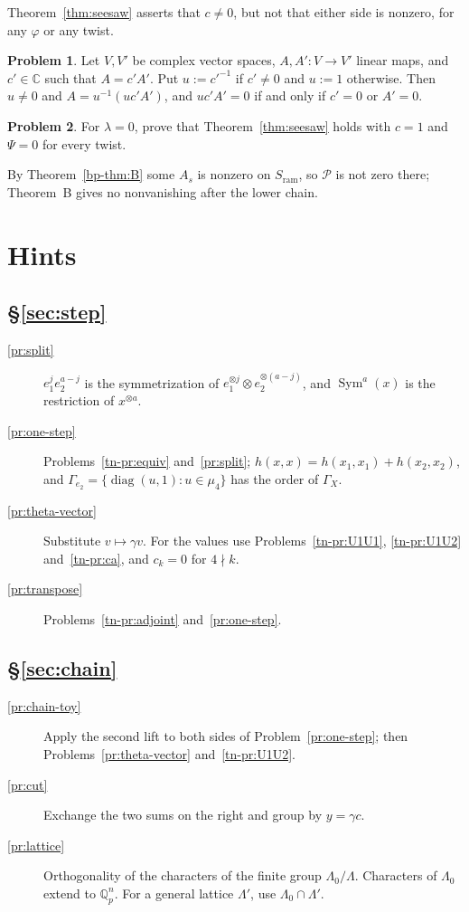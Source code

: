 \documentclass[reqno]{amsart}
\theoremstyle{definition}
\newtheorem{problem}{Problem}[section]
\theoremstyle{plain}
\newcommand{\Q}{\mathbb{Q}}
\newcommand{\C}{\mathbb{C}}
\newcommand{\Pc}{\mathcal{P}}
\newcommand{\Sym}{\operatorname{Sym}}
\newcommand{\ram}{\mathrm{ram}}
\begin{document}
Theorem~\ref{thm:seesaw} asserts that \(c \ne 0\), but not that either side is nonzero, for any \(\varphi\) or any twist.

\begin{problem}\label{pr:unit}
Let \(V, V'\) be complex vector spaces, \(A, A' \colon V \to V'\) linear maps, and \(c' \in \C\) such that \(A = c' A'\).  Put \(u := c'^{-1}\) if \(c' \ne 0\) and \(u := 1\) otherwise.  Then \(u \ne 0\) and \(A = u^{-1}(u c' A')\), and \(uc'A' = 0\) if and only if \(c' = 0\) or \(A' = 0\).
\end{problem}

\begin{problem}\label{pr:degenerate}
For \(\lambda = 0\), prove that Theorem~\ref{thm:seesaw} holds with \(c = 1\) and \(\Psi = 0\) for every twist.
\end{problem}

By Theorem~\ref{bp-thm:B} some \(A_s\) is nonzero on \(S_{\ram}\), so \(\Pc\) is not zero there; Theorem~B gives no nonvanishing after the lower chain.


\section*{Hints}

\subsection*{\S\ref{sec:step}}
\begin{description}
\item[\ref{pr:split}] \(e_1^j e_2^{a-j}\) is the symmetrization of \(e_1^{\otimes j} \otimes e_2^{\otimes(a-j)}\), and \(\Sym^a(x)\) is the restriction of \(x^{\otimes a}\).
\item[\ref{pr:one-step}] Problems~\ref{tn-pr:equiv} and~\ref{pr:split}; \(h(x,x) = h(x_1,x_1) + h(x_2,x_2)\), and \(\Gamma_{e_2} = \{\operatorname{diag}(u,1) : u \in \mu_4\}\) has the order of \(\Gamma_X\).
\item[\ref{pr:theta-vector}] Substitute \(v \mapsto \gamma v\).  For the values use Problems~\ref{tn-pr:U1U1}, \ref{tn-pr:U1U2} and~\ref{tn-pr:ca}, and \(c_k = 0\) for \(4 \nmid k\).
\item[\ref{pr:transpose}] Problems~\ref{tn-pr:adjoint} and~\ref{pr:one-step}.
\end{description}

\subsection*{\S\ref{sec:chain}}
\begin{description}
\item[\ref{pr:chain-toy}] Apply the second lift to both sides of Problem~\ref{pr:one-step}; then Problems~\ref{pr:theta-vector} and~\ref{tn-pr:U1U2}.
\item[\ref{pr:cut}] Exchange the two sums on the right and group by \(y = \gamma c\).
\item[\ref{pr:lattice}] Orthogonality of the characters of the finite group \(\Lambda_0/\Lambda\).  Characters of \(\Lambda_0\) extend to \(\Q_p^n\).  For a general lattice \(\Lambda'\), use \(\Lambda_0 \cap \Lambda'\).
\end{description}
\end{document}
